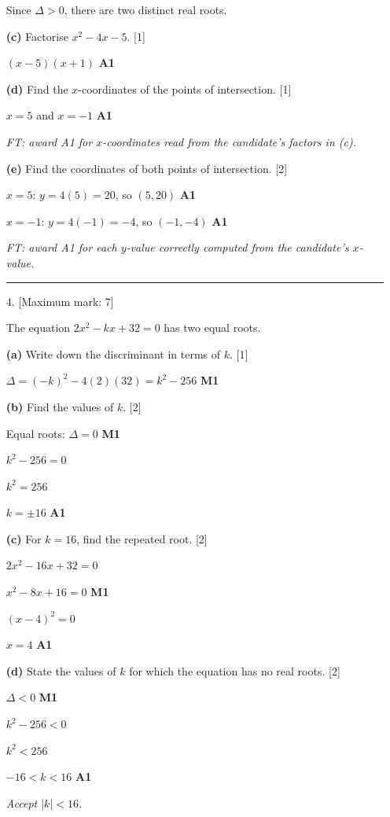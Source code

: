 \documentclass[12pt, twoside]{article}
\begin{document}
\begin{enumerate}[itemsep=0.3cm]
Since $\Delta > 0$, there are two distinct real roots.

\medskip

\textbf{(c)} Factorise $x^2 - 4x - 5$. \hfill [1]

$(x - 5)(x + 1)$ \hfill \textbf{A1}

\medskip

\textbf{(d)} Find the $x$-coordinates of the points
of intersection. \hfill [1]

$x = 5$ and $x = -1$ \hfill \textbf{A1}

\emph{FT: award A1 for $x$-coordinates read from the candidate's factors in (c).}

\medskip

\textbf{(e)} Find the coordinates of both points
of intersection. \hfill [2]

$x = 5$: $y = 4(5) = 20$, so $(5, 20)$ \hfill \textbf{A1}

$x = -1$: $y = 4(-1) = -4$, so $(-1, -4)$ \hfill \textbf{A1}

\emph{FT: award A1 for each $y$-value correctly computed from the candidate's $x$-value.}

\bigskip
\hrule
\bigskip

\item[4.] [Maximum mark: 7]

The equation $2x^2 - kx + 32 = 0$ has two equal roots.

\medskip

\textbf{(a)} Write down the discriminant in terms of $k$. \hfill [1]

$\Delta = (-k)^2 - 4(2)(32) = k^2 - 256$ \hfill \textbf{M1}

\medskip

\textbf{(b)} Find the values of $k$. \hfill [2]

Equal roots: $\Delta = 0$ \hfill \textbf{M1}

$k^2 - 256 = 0$

$k^2 = 256$

$k = \pm 16$ \hfill \textbf{A1}

\medskip

\textbf{(c)} For $k = 16$, find the repeated root. \hfill [2]

$2x^2 - 16x + 32 = 0$

$x^2 - 8x + 16 = 0$ \hfill \textbf{M1}

$(x - 4)^2 = 0$

$x = 4$ \hfill \textbf{A1}

\medskip

\textbf{(d)} State the values of $k$ for which the equation
has no real roots. \hfill [2]

$\Delta < 0$ \hfill \textbf{M1}

$k^2 - 256 < 0$

$k^2 < 256$

$-16 < k < 16$ \hfill \textbf{A1}

\emph{Accept $|k| < 16$.}

\end{enumerate}
\end{document}

